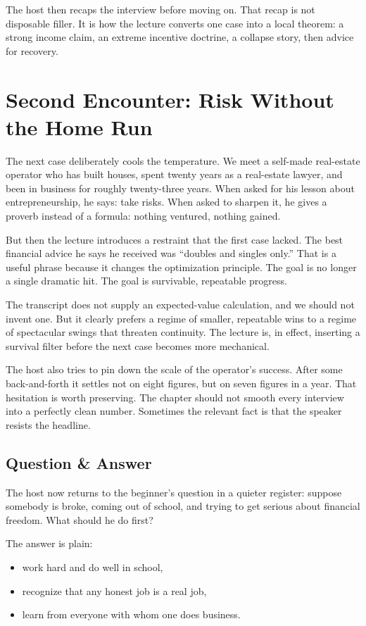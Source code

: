 The host then recaps the interview before moving on. That recap is not disposable filler. It is how the lecture converts one case into a local theorem: a strong income claim, an extreme incentive doctrine, a collapse story, then advice for recovery.

\section{Second Encounter: Risk Without the Home Run}

The next case deliberately cools the temperature. We meet a self-made real-estate operator who has built houses, spent twenty years as a real-estate lawyer, and been in business for roughly twenty-three years. When asked for his lesson about entrepreneurship, he says: take risks. When asked to sharpen it, he gives a proverb instead of a formula: nothing ventured, nothing gained.

But then the lecture introduces a restraint that the first case lacked. The best financial advice he says he received was ``doubles and singles only.'' That is a useful phrase because it changes the optimization principle. The goal is no longer a single dramatic hit. The goal is survivable, repeatable progress.

The transcript does not supply an expected-value calculation, and we should not invent one. But it clearly prefers a regime of smaller, repeatable wins to a regime of spectacular swings that threaten continuity. The lecture is, in effect, inserting a survival filter before the next case becomes more mechanical.

The host also tries to pin down the scale of the operator's success. After some back-and-forth it settles not on eight figures, but on seven figures in a year. That hesitation is worth preserving. The chapter should not smooth every interview into a perfectly clean number. Sometimes the relevant fact is that the speaker resists the headline.

\subsection{Question \& Answer}

The host now returns to the beginner's question in a quieter register: suppose somebody is broke, coming out of school, and trying to get serious about financial freedom. What should he do first?

The answer is plain:
\begin{itemize}
\item work hard and do well in school,
\item recognize that any honest job is a real job,
\item learn from everyone with whom one does business.
\end{itemize}

